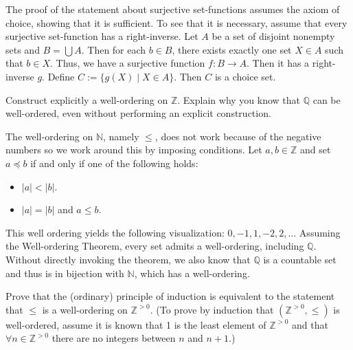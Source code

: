 \documentclass[../../master.tex]{subfiles}
\begin{document}
    \begin{solution}
        The proof of the statement about surjective set-functions assumes the
        axiom of choice, showing that it is sufficient. To see that it is
        necessary, assume that every surjective set-function has a
        right-inverse. Let $A$ be a set of disjoint nonempty sets and $B =
        \bigcup A$. Then for each $b \in B$, there exists exactly one set $X \in
        A$ such that $b \in X$. Thus, we have a surjective function $f: B \to
        A$. Then it has a right-inverse $g$. Define $C:= \{g(X) \mid X \in A\}$.
        Then $C$ is a choice set.
    \end{solution}

    \begin{problem}
        Construct explicitly a well-ordering on $\mathbb{Z}$. Explain why you
        know that $\mathbb{Q}$ can be well-ordered, even without performing an
        explicit construction.
    \end{problem}

    \begin{solution}
        The well-ordering on $\mathbb{N}$, namely $\leq$, does not work because
        of the negative numbers so we work around this by imposing conditions.
        Let $a, b \in \mathbb{Z}$ and set $a \preceq b$ if and only if one of
        the following holds:
        \begin{itemize}
            \item $|a| < |b|$.
            \item $|a| = |b|$ and $a \leq b$.
        \end{itemize}
        This well ordering yields the following visualization: $0, -1, 1, -2, 2,
        \ldots$ Assuming the Well-ordering Theorem, every set admits a
        well-ordering, including $\mathbb{Q}$. Without directly invoking the
        theorem, we also know that $\mathbb{Q}$ is a countable set and thus is
        in bijection with $\mathbb{N}$, which has a well-ordering. 
    \end{solution}

    \begin{problem}
        Prove that the (ordinary) principle of induction is equivalent to the
        statement that $\leq$ is a well-ordering on $\mathbb{Z}^{>0}$. (To prove
        by induction that $(\mathbb{Z}^{>0}, \leq)$ is well-ordered, assume it
        is known that 1 is the least element of $\mathbb{Z}^{>0}$ and that
        $\forall n \in \mathbb{Z}^{>0}$ there are no integers between $n$ and $n
        + 1$.)
    \end{problem}
\end{document}
